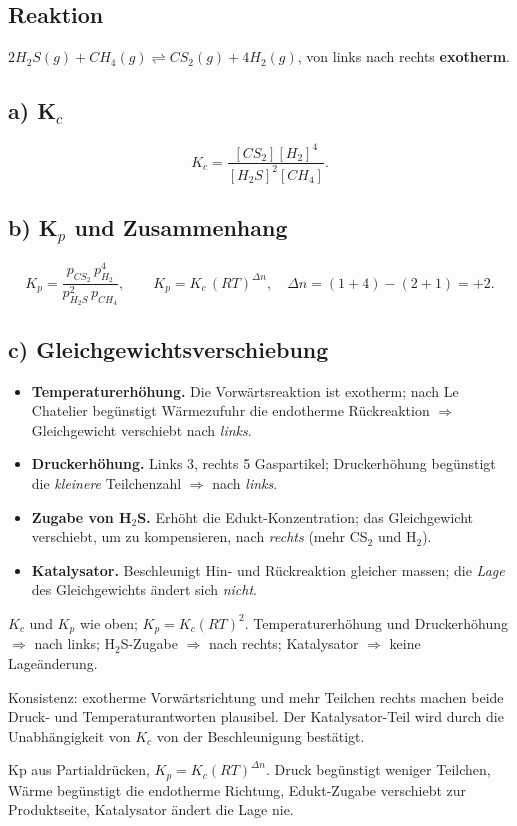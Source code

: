 
\subsection*{Reaktion}
$2H_2S(g) + CH_4(g) \rightleftharpoons CS_2(g) + 4H_2(g)$, von links nach
rechts \textbf{exotherm}.

\subsection*{a) K$_c$}
\[
  K_c = \frac{[CS_2][H_2]^4}{[H_2S]^2[CH_4]}.
\]

\subsection*{b) K$_p$ und Zusammenhang}
\[
  K_p = \frac{p_{CS_2}\,p_{H_2}^4}{p_{H_2S}^2\,p_{CH_4}},
  \qquad
  K_p = K_c \,(RT)^{\Delta n},\quad
  \Delta n = (1+4)-(2+1) = +2 .
\]

\subsection*{c) Gleichgewichtsverschiebung}
\begin{itemize}
  \item \textbf{Temperaturerhöhung.} Die Vorwärtsreaktion ist exotherm; nach
        Le Chatelier begünstigt Wärmezufuhr die endotherme Rückreaktion
        $\Rightarrow$ Gleichgewicht verschiebt nach \emph{links}.
  \item \textbf{Druckerhöhung.} Links 3, rechts 5 Gaspartikel; Druckerhöhung
        begünstigt die \emph{kleinere} Teilchenzahl $\Rightarrow$ nach
        \emph{links}.
  \item \textbf{Zugabe von H$_2$S.} Erhöht die Edukt-Konzentration; das
        Gleichgewicht verschiebt, um zu kompensieren, nach \emph{rechts}
        (mehr CS$_2$ und H$_2$).
  \item \textbf{Katalysator.} Beschleunigt Hin- und Rückreaktion gleicher
        massen; die \emph{Lage} des Gleichgewichts ändert sich \emph{nicht}.
\end{itemize}

\begin{ergebnis}
$K_c$ und $K_p$ wie oben; $K_p=K_c(RT)^2$. Temperaturerhöhung und
Druckerhöhung $\Rightarrow$ nach links; H$_2$S-Zugabe $\Rightarrow$ nach
rechts; Katalysator $\Rightarrow$ keine Lageänderung.
\end{ergebnis}

\begin{kontrolle}
Konsistenz: exotherme Vorwärtsrichtung und mehr Teilchen rechts machen
beide Druck- und Temperaturantworten plausibel. Der Katalysator-Teil wird
durch die Unabhängigkeit von $K_c$ von der Beschleunigung bestätigt.
\end{kontrolle}

\begin{merksatz}
Kp aus Partialdrücken, $K_p=K_c(RT)^{\Delta n}$. Druck begünstigt weniger
Teilchen, Wärme begünstigt die endotherme Richtung, Edukt-Zugabe verschiebt
zur Produktseite, Katalysator ändert die Lage nie.
\end{merksatz}

